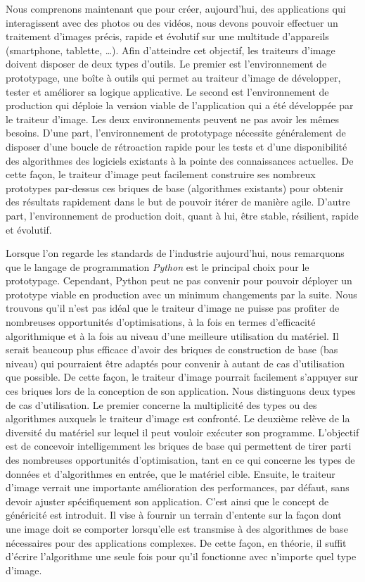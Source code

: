 Nous comprenons maintenant que pour créer, aujourd'hui, des applications qui interagissent avec des photos ou des
vidéos, nous devons pouvoir effectuer un traitement d'images précis, rapide et évolutif sur une multitude d'appareils
(smartphone, tablette, \ldots). Afin d'atteindre cet objectif, les traiteurs d'image doivent disposer de deux types
d'outils. Le premier est l'environnement de prototypage, une boîte à outils qui permet au traiteur d'image de
développer, tester et améliorer sa logique applicative. Le second est l'environnement de production qui déploie la
version viable de l'application qui a été développée par le traiteur d'image. Les deux environnements peuvent ne pas
avoir les mêmes besoins. D'une part, l'environnement de prototypage nécessite généralement de disposer d'une boucle de
rétroaction rapide pour les tests et d'une disponibilité des algorithmes des logiciels existants à la pointe des
connaissances actuelles. De cette façon, le traiteur d'image peut facilement construire ses nombreux prototypes
par-dessus ces briques de base (algorithmes existants) pour obtenir des résultats rapidement dans le but de pouvoir
itérer de manière agile. D'autre part, l'environnement de production doit, quant à lui, être stable, résilient, rapide
et évolutif.

Lorsque l'on regarde les standards de l'industrie aujourd'hui, nous remarquons que le langage de programmation
\emph{Python} est le principal choix pour le prototypage. Cependant, Python peut ne pas convenir pour pouvoir déployer
un prototype viable en production avec un minimum changements par la suite. Nous trouvons qu'il n'est pas idéal que le
traiteur d'image ne puisse pas profiter de nombreuses opportunités d'optimisations, à la fois en termes d'efficacité
algorithmique et à la fois au niveau d'une meilleure utilisation du matériel. Il serait beaucoup plus efficace d'avoir
des briques de construction de base (bas niveau) qui pourraient être adaptés pour convenir à autant de cas d'utilisation
que possible. De cette façon, le traiteur d'image pourrait facilement s'appuyer sur ces briques lors de la conception de
son application. Nous distinguons deux types de cas d'utilisation. Le premier concerne la multiplicité des types ou des
algorithmes auxquels le traiteur d'image est confronté. Le deuxième relève de la diversité du matériel sur lequel il
peut vouloir exécuter son programme. L'objectif est de concevoir intelligemment les briques de base qui permettent de
tirer parti des nombreuses opportunités d'optimisation, tant en ce qui concerne les types de données et d'algorithmes en
entrée, que le matériel cible. Ensuite, le traiteur d'image verrait une importante amélioration des performances, par
défaut, sans devoir ajuster spécifiquement son application. C'est ainsi que le concept de généricité est introduit. Il
vise à fournir un terrain d'entente sur la façon dont une image doit se comporter lorsqu'elle est transmise à des
algorithmes de base nécessaires pour des applications complexes. De cette façon, en théorie, il suffit d'écrire
l'algorithme une seule fois pour qu'il fonctionne avec n'importe quel type d'image.

